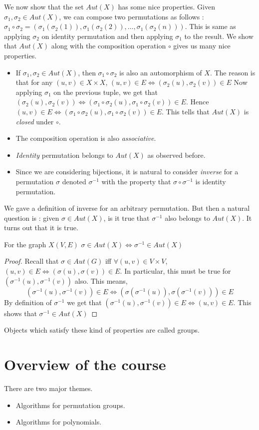 We now show that the set $Aut(X)$ has some nice properties. Given $\sigma_1,
\sigma_2 \in Aut(X)$, we can compose two permutations as follows :$\sigma_1
\circ \sigma_2 = (\sigma_1(\sigma_2(1)),\sigma_1(\sigma_2(2)), \ldots,  
\sigma_1(\sigma_2(n)))$. This is same as applying $\sigma_2$ on identity
permutation and then applying $\sigma_1$ to the result. We show that
$Aut(X)$ along with the composition operation $\circ$
gives us many nice properties.
\begin{itemize}
	\item If $\sigma_1, \sigma_2 \in Aut(X)$, then $\sigma_1 \circ
		\sigma_2$ is also an automorphism of $X$. The reason is that
		for any $(u,v) \in X \times X$, $(u,v) \in E \iff
		(\sigma_2(u), \sigma_2(v)) \in E$ Now applying $\sigma_1$ on
		the previous tuple, we get that $(\sigma_2(u), \sigma_2(v)) 
		\iff (\sigma_1 \circ \sigma_2(u), \sigma_1 \circ \sigma_2(v))
		\in E$. Hence $(u,v) \in E \iff (\sigma_1 \circ \sigma_2(u),
		\sigma_1 \circ \sigma_2(v)) \in E$.
		This tells that $Aut(X)$ is \emph{closed} under $\circ$.
	\item The composition operation is also \emph{associative}.
	\item \emph{Identity} permutation belongs to $Aut(X)$ as observed
	before.  
	\item Since we are considering bijections, it is natural to
		consider \emph{inverse} for a permutation $\sigma$ denoted
		$\sigma^{-1}$ with the property that $\sigma \circ
		\sigma^{-1}$ is identity permutation. 

\end{itemize}
We gave a definition of inverse for an arbitrary permutation. But then a
natural question is : given $\sigma \in Aut(X)$, is it true that $\sigma^{-1}$
also belongs to $Aut(X)$. It turns out that it is true.
\begin{claim}
	For the graph $X(V,E)$
	$\sigma \in Aut(X) \iff \sigma^{-1} \in Aut(X)$
\end{claim}
\begin{proof}
	Recall that $\sigma \in Aut(G)$ iff $\forall (u,v) \in V \times V$,
	$(u,v) \in E \iff (\sigma(u), \sigma(v)) \in E$. In particular, this
	must be true for $(\sigma^{-1}(u), \sigma^{-1}(v))$ also. This means,
	\[ (\sigma^{-1}(u), \sigma^{-1}(v)) \in E \iff (\sigma(\sigma^{-1}(u)),
	\sigma(\sigma^{-1}(v))) \in E \]
	By definition of $\sigma^{-1}$ we get that 
	$(\sigma^{-1}(u), \sigma^{-1}(v)) \in E \iff (u,v) \in E$. This shows
	that $\sigma^{-1} \in Aut(X)$ 
\end{proof}
Objects which satisfy these kind of properties are called groups.

\section{Overview of the course}
There are two major themes. 
\begin{itemize}
	\item Algorithms for permutation groups.
	\item Algorithms for polynomials.
\end{itemize}
